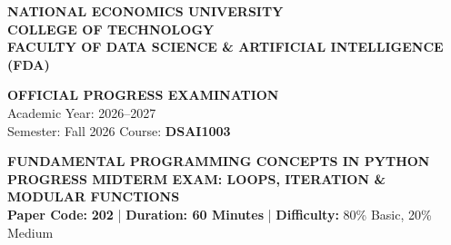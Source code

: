 \documentclass[11pt,a4paper]{article}
\begin{document}

\noindent
\begin{minipage}[t]{0.64\textwidth}
  \raggedright\small
  \textbf{NATIONAL ECONOMICS UNIVERSITY}\\
  \textbf{COLLEGE OF TECHNOLOGY}\\
  \textbf{FACULTY OF DATA SCIENCE \& ARTIFICIAL INTELLIGENCE (FDA)}
\end{minipage}%
\hfill
\begin{minipage}[t]{0.34\textwidth}
  \raggedleft\footnotesize
  \textbf{OFFICIAL PROGRESS EXAMINATION}\\
  Academic Year: 2026--2027\\
  Semester: Fall 2026 \quad Course: \textbf{DSAI1003}
\end{minipage}

\vspace{0.08em}

\begin{center}
  {\large\bfseries\color{primaryblue} FUNDAMENTAL PROGRAMMING CONCEPTS IN PYTHON}\\[0.04em]
  {\normalsize\bfseries PROGRESS MIDTERM EXAM: LOOPS, ITERATION \& MODULAR FUNCTIONS}\\[0.04em]
  {\footnotesize\textbf{Paper Code:} \textbf{202} \quad | \quad \textbf{Duration: 60 Minutes} \quad | \quad \textbf{Difficulty:} 80\% Basic, 20\% Medium}
\end{center}

\vspace{0.04em}
\end{document}
